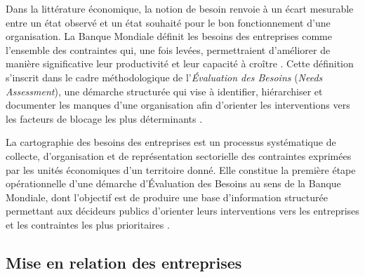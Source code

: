 \documentclass[12pt, a4paper, oneside]{report}
\begin{document}
	Dans la litt\'erature \'economique, la notion de besoin renvoie \`a
	un \'ecart mesurable entre un \'etat observ\'e et un \'etat souhait\'e
	pour le bon fonctionnement d'une organisation. La Banque Mondiale
	d\'efinit les besoins des entreprises comme l'ensemble des contraintes
	qui, une fois lev\'ees, permettraient d'am\'eliorer de mani\`ere
	significative leur productivit\'e et leur capacit\'e \`a cro\^itre
	\cite{world_bank_doing_business_2020}. Cette d\'efinition s'inscrit
	dans le cadre m\'ethodologique de l'\textit{\'Evaluation des Besoins}
	(\textit{Needs Assessment}), une d\'emarche structur\'ee qui vise \`a
	identifier, hi\'erarchiser et documenter les manques d'une organisation
	afin d'orienter les interventions vers les facteurs de blocage les plus
	d\'eterminants \cite{world_bank_needs_2014}.
	
	La cartographie des besoins des entreprises est un processus
	syst\'ematique de collecte, d'organisation et de repr\'esentation
	sectorielle des contraintes exprim\'ees par les unit\'es
	\'economiques d'un territoire donn\'e. Elle constitue la premi\`ere
	\'etape op\'erationnelle d'une d\'emarche d'\'Evaluation des Besoins
	au sens de la Banque Mondiale, dont l'objectif est de produire une
	base d'information structur\'ee permettant aux d\'ecideurs publics
	d'orienter leurs interventions vers les entreprises et les contraintes
	les plus prioritaires \cite{world_bank_needs_2014}.
	
	
	\subsection{Mise en relation des entreprises}
	
\end{document}
